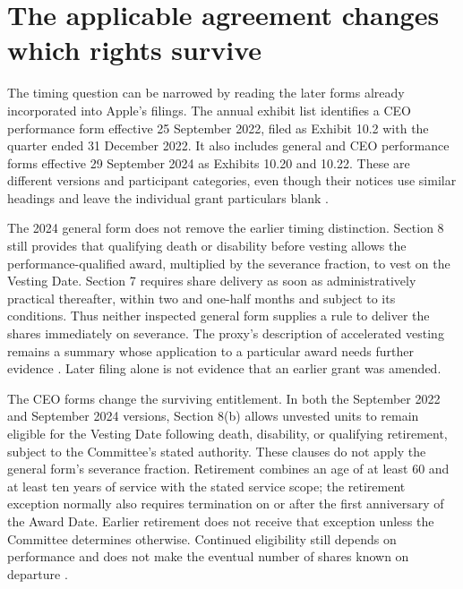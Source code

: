 \section{The applicable agreement changes which rights survive}
\label{sec:apple-award-versions}

The timing question can be narrowed by reading the later forms already
incorporated into Apple's filings. The annual exhibit list identifies a CEO
performance form effective 25 September 2022, filed as Exhibit 10.2 with the
quarter ended 31 December 2022. It also includes general and CEO performance
forms effective 29 September 2024 as Exhibits 10.20 and 10.22. These are
different versions and participant categories, even though their notices use
similar headings and leave the individual grant particulars blank
\citep[annual exhibit list; Exhibits 10.20 and 10.22]{apple2024}
\citep[Exhibit 10.2]{apple2023q1awards}.

The 2024 general form does not remove the earlier timing distinction.
Section 8 still provides that qualifying death or disability before vesting
allows the performance-qualified award, multiplied by the severance fraction,
to vest on the Vesting Date. Section 7 requires share delivery as soon as
administratively practical thereafter, within two and one-half months and
subject to its conditions. Thus neither inspected general form supplies a
rule to deliver the shares immediately on severance. The proxy's description
of accelerated vesting remains a summary whose application to a particular
award needs further evidence \citep[Exhibit 10.20, Sections 7--8]{apple2024}
\citep[printed p.~53]{apple2025proxy}. Later filing alone is not evidence
that an earlier grant was amended.

The CEO forms change the surviving entitlement. In both the September 2022
and September 2024 versions, Section 8(b) allows unvested units to remain
eligible for the Vesting Date following death, disability, or qualifying
retirement, subject to the Committee's stated authority. These clauses do not
apply the general form's severance fraction. Retirement combines an age of
at least 60 and at least ten years of service with the stated service scope;
the retirement exception normally also requires termination on or after the
first anniversary of the Award Date. Earlier retirement does not receive
that exception unless the Committee determines otherwise. Continued
eligibility still depends on performance and does not make the eventual
number of shares known on departure
\citep[Exhibit 10.2, Sections 3--4 and 8]{apple2023q1awards}
\citep[Exhibit 10.22, Sections 3--4 and 8]{apple2024}.

